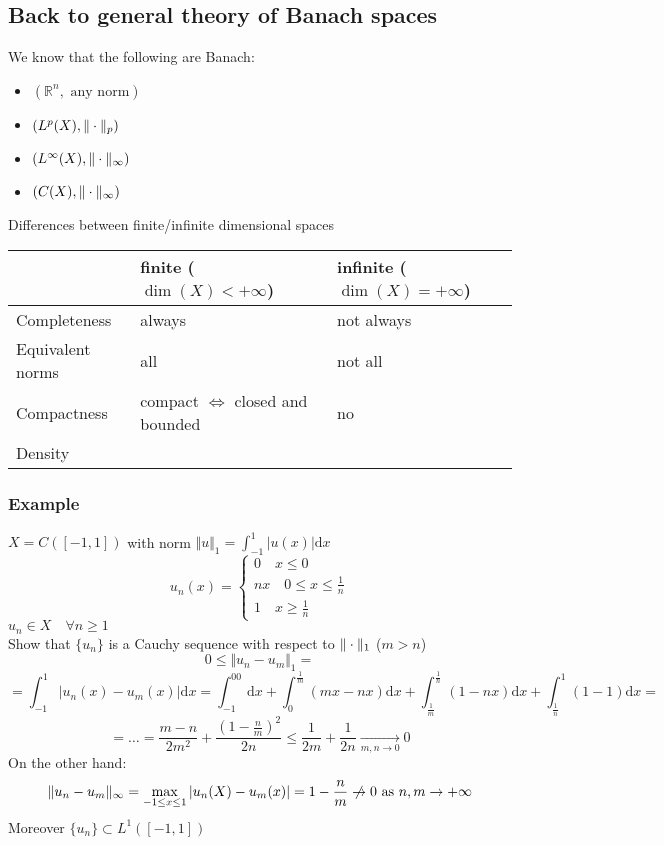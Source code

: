 \subsection{Back to general theory of Banach spaces}
We know that the following are Banach:
\begin{itemize}
    \item $(\mathbb R^n,\text{ any norm})$
    \item $(L^p(X),\Vert \cdot \Vert_p)$
    \item $(L^\infty(X),\Vert \cdot \Vert_\infty)$
    \item $(C(X),\Vert \cdot \Vert_\infty)$
\end{itemize}
Differences between finite/infinite dimensional spaces
\begin{center}
    \begin{table}[h]
        \begin{tabular}{lll}
        \hline
                         & finite ($\dim(X)<+\infty$)         & infinite ($\dim(X)=+\infty$) \\ \hline
        Completeness     & always                            & not always                  \\
        Equivalent norms & all                               & not all                     \\
        Compactness      & compact $\iff$ closed and bounded & no                          \\
        Density          &                                   &                            \\\hline
        \end{tabular}
\end{table}
\end{center}

\subsubsection{Example}
$X=C([-1,1])$ with norm $\Vert u\Vert_1=\int_{-1}^1|u(x)|\mathrm dx$
$$u_n(x)=\begin{cases}
    0\quad x\leq0\\nx\quad 0\leq x\leq \frac 1n\\1\quad x\geq \frac 1n
\end{cases}$$
$u_n\in X\quad \forall n\geq 1$\\
Show that $\{u_n\}$ is a Cauchy sequence with respect to $\Vert \cdot \Vert_1$ ($m>n$)
$$0\leq \Vert u_n-u_m\Vert_1=$$
$$=\int_{-1}^1|u_n(x)-u_m(x)|\mathrm dx=\int_{-1}^00\mathrm dx+\int_0^{\frac 1m}(mx-nx)\mathrm dx+\int_{\frac 1m}^{\frac 1n}(1-nx)\mathrm dx+\int_{\frac 1n}^1(1-1)\mathrm dx= $$
$$= \dots = \frac{m-n}{2m^2}+\frac{(1-\frac nm)^2}{2n}\leq \frac 1{2m}+\frac 1{2n}\xrightarrow[m,n\to 0]{}0$$
On the other hand:
$$\Vert u_n-u_m\Vert_\infty=\max_{-1\leq x\leq 1}|u_n(X)-u_m(x)|=1-\frac nm\centernot\to0\text{ as }n,m\to +\infty$$
Moreover $\{u_n\}\subset L^1([-1,1])$
